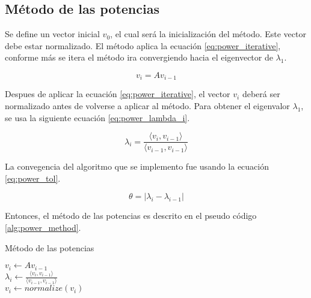 \subsection{Método de las potencias \label{sec:power}}

Se define un vector inicial $v_0$, el cual será la inicialización del método. Este vector debe estar normalizado. El método aplica la ecuación \ref{eq:power_iterative}, conforme más se itera el método ira convergiendo hacia el eigenvector de $\lambda_1$.

\begin{equation}
    v_i = Av_{i-1} \label{eq:power_iterative}
\end{equation}

Despues de aplicar la ecuación \ref{eq:power_iterative}, el vector $v_i$ deberá ser normalizado antes de volverse a aplicar al método. Para obtener el eigenvalor $\lambda_1$, se usa la siguiente ecuación \ref{eq:power_lambda_i}.

\begin{equation}
    \lambda_i = \frac{\langle v_i , v_{i-1}\rangle}{\langle v_{i-1}, v_{i-1}\rangle} \label{eq:power_lambda_i}
\end{equation}

La convegencia del algoritmo que se implemento fue usando la ecuación \ref{eq:power_tol}.

\begin{equation}
    \theta = |\lambda_i - \lambda_{i-1}| \label{eq:power_tol}
\end{equation}

Entonces, el método de las potencias es descrito en el pseudo código \ref{alg:power_method}.

\begin{algorithm}[H]
    \caption{Método de las potencias}
    \label{alg:power_method}
    {
        $v_i \gets Av_{i-1}$\\
        $\lambda_i \gets \frac{\langle v_i , v_{i-1}\rangle}{\langle v_{i-1}, v_{i-1}\rangle}$\\
        $v_i \gets normalize(v_i)$\\
    }
\end{algorithm}